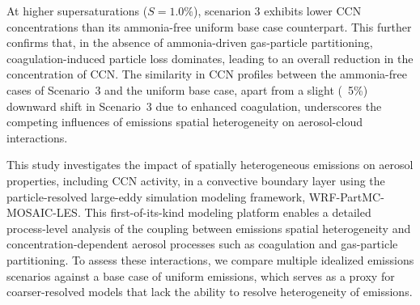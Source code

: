 \documentclass[journal abbreviation, manuscript]{copernicus}
\begin{document}
At higher supersaturations ($S=1.0\%$), scenarion 3 exhibits lower CCN
concentrations than its ammonia-free uniform base case
counterpart. This further confirms that, in the absence of
ammonia-driven gas-particle partitioning, coagulation-induced particle
loss dominates, leading to an overall reduction in the concentration of 
CCN. The similarity in CCN profiles between the ammonia-free
cases of Scenario~3 and the uniform base case, apart from a slight
(~5\%) downward shift in Scenario~3 due to enhanced coagulation,
underscores the competing influences of emissions spatial
heterogeneity on aerosol-cloud interactions.

\conclusions  %


This study investigates the impact of spatially heterogeneous
emissions on aerosol properties, including CCN activity, in a
convective boundary layer using the particle-resolved large-eddy
simulation modeling framework, WRF-PartMC-MOSAIC-LES. This
first-of-its-kind modeling platform enables a detailed process-level
analysis of the coupling between emissions spatial heterogeneity and
concentration-dependent aerosol processes such as coagulation and
gas-particle partitioning. To assess these interactions, we compare
multiple idealized emissions scenarios against a base case of uniform
emissions, which serves as a proxy for coarser-resolved models that
lack the ability to resolve heterogeneity of emissions.
\end{document}
